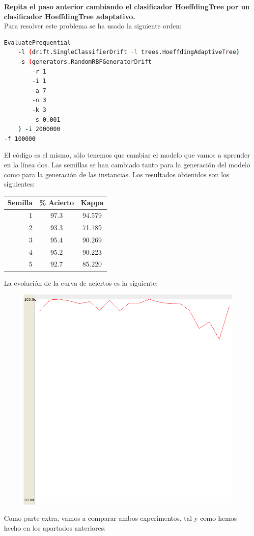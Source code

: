\documentclass[11pt]{article}
\begin{document}
\textbf{Repita el paso anterior cambiando el clasificador HoeffdingTree por un clasificador HoeffdingTree adaptativo.} \\

Para resolver este problema se ha usado la siguiente orden:

\begin{lstlisting}[language=bash]
EvaluatePrequential 
	-l (drift.SingleClassifierDrift -l trees.HoeffdingAdaptiveTree)
	-s (generators.RandomRBFGeneratorDrift 
		-r 1 
		-i 1 
		-a 7 
		-n 3
		-k 3 
		-s 0.001 
	) -i 2000000
-f 100000
\end{lstlisting}

El código es el mismo, sólo tenemos que cambiar el modelo que vamos a aprender en la línea dos. Las semillas se han cambiado tanto para la generación del modelo como para la generación de las instancias. Los resultados obtenidos son los siguientes:

\begin{table}[H]
	\centering
	\begin{tabular}{rcc}
		\textbf{Semilla} & \textbf{\% Acierto} & \textbf{Kappa} \\ \hline
		1 & 97.3 & 94.579 \\
		2 & 93.3 & 71.189 \\
		3 & 95.4 & 90.269 \\
		4 & 95.2 & 90.223 \\
		5 & 92.7 & 85.220
	\end{tabular}
\end{table}

La evolución de la curva de aciertos es la siguiente:

\begin{figure}[H]
	\centering
	\includegraphics[width=0.5\linewidth]{2_5_2.png}
\end{figure}

Como parte extra, vamos a comparar ambos experimentos, tal y como hemos hecho en los apartados anteriores:
\end{document}
